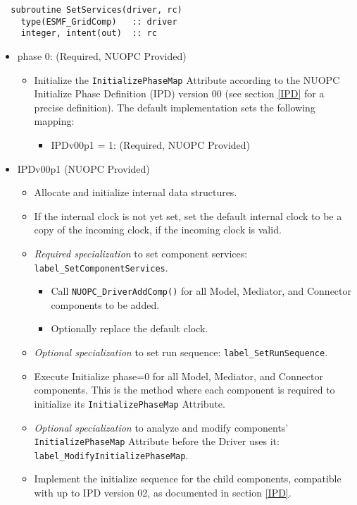 \begin{verbatim}  subroutine SetServices(driver, rc)
    type(ESMF_GridComp)   :: driver
    integer, intent(out)  :: rc
\end{verbatim}

\begin{itemize}
\item phase 0: ({\sc Required, NUOPC Provided})
  \begin{itemize}
  \item Initialize the {\tt InitializePhaseMap} Attribute according to the NUOPC Initialize Phase Definition (IPD) version 00 (see section \ref{IPD} for a precise definition). The default implementation sets the following mapping:
    \begin{itemize}
    \item IPDv00p1 = 1: ({\sc Required, NUOPC Provided})
    \end{itemize}  
  \end{itemize}  
\item IPDv00p1 ({\sc NUOPC Provided})
  \begin{itemize}
  \item Allocate and initialize internal data structures.
  \item If the internal clock is not yet set, set the default internal clock to be a copy of the incoming clock, if the incoming clock is valid.
  \item {\it Required specialization} to set component services: {\tt label\_SetComponentServices}.
  \begin{itemize}
    \item Call {\tt NUOPC\_DriverAddComp()} for all Model, Mediator, and Connector components to be added.
    \item Optionally replace the default clock. 
  \end{itemize}
  \item {\it Optional specialization} to set run sequence: {\tt label\_SetRunSequence}.

  \item Execute Initialize phase=0 for all Model, Mediator, and Connector components. This is the method where each component is required to initialize its {\tt InitializePhaseMap} Attribute.
  \item {\it Optional specialization} to analyze and modify components' {\tt InitializePhaseMap} Attribute before the Driver uses it: {\tt label\_ModifyInitializePhaseMap}.
  \item Implement the initialize sequence for the child components, compatible with up to IPD version 02, as documented in section \ref{IPD}.
  \end{itemize}  
\end{itemize}

